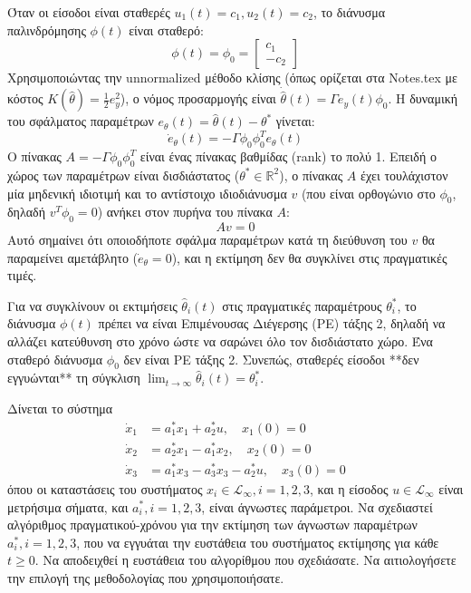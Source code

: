 \documentclass[a4paper,11pt]{article}
\begin{document}
\begin{answer}
Όταν οι είσοδοι είναι σταθερές $u_1(t) = c_1, u_2(t) = c_2$, το διάνυσμα παλινδρόμησης $\phi(t)$ είναι σταθερό:
\[ \phi(t) = \phi_0 = \begin{bmatrix} c_1 \\ -c_2 \end{bmatrix} \]
Χρησιμοποιώντας την unnormalized μέθοδο κλίσης (όπως ορίζεται στα Notes.tex με κόστος $K(\hat{\theta}) = \frac{1}{2} e_y^2$), ο νόμος προσαρμογής είναι $\dot{\hat{\theta}}(t) = \Gamma e_y(t) \phi_0$. Η δυναμική του σφάλματος παραμέτρων $e_\theta(t) = \hat{\theta}(t) - \theta^*$ γίνεται:
\[ \dot{e}_\theta(t) = -\Gamma \phi_0 \phi_0^T e_\theta(t) \]
Ο πίνακας $A = -\Gamma \phi_0 \phi_0^T$ είναι ένας πίνακας βαθμίδας (rank) το πολύ 1. Επειδή ο χώρος των παραμέτρων είναι δισδιάστατος ($\theta^* \in \mathbb{R}^2$), ο πίνακας $A$ έχει τουλάχιστον μία μηδενική ιδιοτιμή και το αντίστοιχο ιδιοδιάνυσμα $v$ (που είναι ορθογώνιο στο $\phi_0$, δηλαδή $v^T \phi_0 = 0$) ανήκει στον πυρήνα του πίνακα $A$:
\[ A v = 0 \]
Αυτό σημαίνει ότι οποιοδήποτε σφάλμα παραμέτρων κατά τη διεύθυνση του $v$ θα παραμείνει αμετάβλητο ($\dot{e}_\theta = 0$), και η εκτίμηση δεν θα συγκλίνει στις πραγματικές τιμές.

Για να συγκλίνουν οι εκτιμήσεις $\hat{\theta}_i(t)$ στις πραγματικές παραμέτρους $\theta_i^*$, το διάνυσμα $\phi(t)$ πρέπει να είναι Επιμένουσας Διέγερσης (PE) τάξης 2, δηλαδή να αλλάζει κατεύθυνση στο χρόνο ώστε να σαρώνει όλο τον δισδιάστατο χώρο. Ένα σταθερό διάνυσμα $\phi_0$ δεν είναι PE τάξης 2. Συνεπώς, σταθερές είσοδοι **δεν εγγυώνται** τη σύγκλιση $\lim_{t \to \infty} \hat{\theta}_i(t) = \theta_i^*$.
\end{answer}

\begin{question}
Δίνεται το σύστημα
\begin{align}
    \dot{x}_1 &= a_1^* x_1 + a_2^* u, \quad x_1(0) = 0 \\
    \dot{x}_2 &= a_2^* x_1 - a_1^* x_2, \quad x_2(0) = 0 \\
    \dot{x}_3 &= a_1^* x_3 - a_3^* x_3 - a_2^* u, \quad x_3(0) = 0
\end{align}
όπου οι καταστάσεις του συστήματος $x_i \in \mathcal{L}_\infty, i = 1, 2, 3$, και η είσοδος $u \in \mathcal{L}_\infty$ είναι μετρήσιμα σήματα, και $a_i^*, i = 1, 2, 3$, είναι άγνωστες παράμετροι. Να σχεδιαστεί αλγόριθμος πραγματικού-χρόνου για την εκτίμηση των άγνωστων παραμέτρων $a_i^*, i = 1, 2, 3$, που να εγγυάται την ευστάθεια του συστήματος εκτίμησης για κάθε $t \ge 0$. Να αποδειχθεί η ευστάθεια του αλγορίθμου που σχεδιάσατε. Να αιτιολογήσετε την επιλογή της μεθοδολογίας που χρησιμοποιήσατε.
\end{question}
\end{document}
